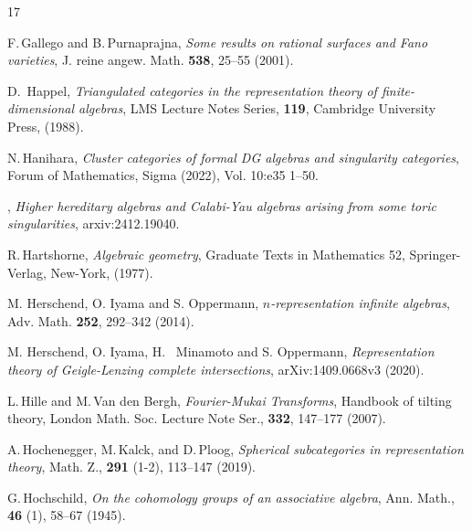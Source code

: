 \documentclass[a4paper,11pt, reqno]{amsart}
\theoremstyle{plain}
\theoremstyle{definition}
\numberwithin{equation}{section}
\begin{document}
\begin{thebibliography}{17}

F.\,Gallego and B.\,Purnaprajna, {\it Some results on rational surfaces and Fano varieties}, J. reine angew. Math. \textbf{538}, 25--55 (2001).




 D.~Happel, {\it Triangulated categories in the representation theory of finite-dimensional algebras}, LMS Lecture Notes Series,  \textbf{119}, Cambridge University Press, (1988).


N.\,Hanihara, 
{\it Cluster categories of formal DG algebras and singularity categories}, 
Forum of Mathematics, Sigma (2022), Vol.
10:e35 1--50.

\bysame, 
{\it Higher hereditary algebras and Calabi-Yau algebras arising from some toric singularities}, arxiv:2412.19040.

R.\,Hartshorne, {\it Algebraic geometry}, Graduate Texts in Mathematics 52, Springer-Verlag, New-York, (1977).


 M. Herschend, O. Iyama and S. Oppermann, {\it $n$-representation infinite algebras}, Adv. Math. {\bf 252}, 292--342 (2014).

 M. Herschend, O. Iyama, H.~ Minamoto and S. Oppermann, {\it Representation theory of Geigle-Lenzing complete intersections}, arXiv:1409.0668v3 (2020).


L.\,Hille and M.\,Van den Bergh, 
{\it  Fourier-Mukai Transforms},  Handbook of tilting
theory, London Math. Soc. Lecture Note Ser., \textbf{332}, 147--177 (2007).




A.\,Hochenegger, M.\,Kalck, and D.\,Ploog, \emph{Spherical
subcategories in representation theory}, Math. Z., \textbf{291} (1-2), 113--147
(2019).

G.\,Hochschild,  {\it On the cohomology groups of an associative algebra}, Ann. Math., \textbf{46} (1), 58--67 (1945).


\end{thebibliography}
\end{document}
